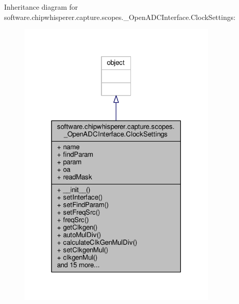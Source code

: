 Inheritance diagram for software.\+chipwhisperer.\+capture.\+scopes.\+\_\+\+Open\+A\+D\+C\+Interface.\+Clock\+Settings\+:\nopagebreak
\begin{figure}[H]
\begin{center}
\leavevmode
\includegraphics[width=270pt]{dc/d7a/classsoftware_1_1chipwhisperer_1_1capture_1_1scopes_1_1__OpenADCInterface_1_1ClockSettings__inherit__graph}
\end{center}
\end{figure}


